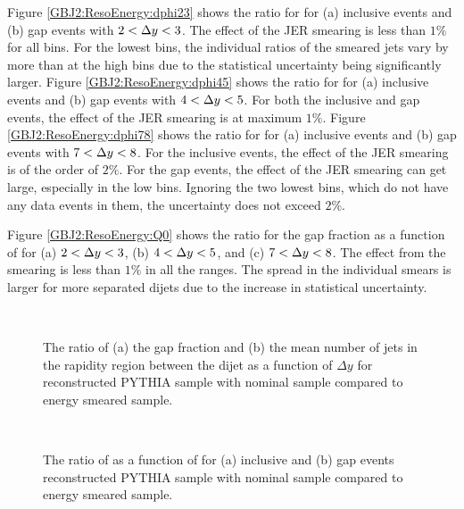 Figure \ref{GBJ2:ResoEnergy:dphi23} shows the ratio for \dphiDist{} for (a) inclusive events and (b) gap events with  $2<\mbox{$\Delta y$}{}<3$.
The effect of the JER smearing is less than  $1\%$ for all bins.
For the lowest \dphi{} bins, the individual ratios of the smeared jets vary by more than at the high \dphi{} bins due to the statistical uncertainty being significantly larger.
Figure \ref{GBJ2:ResoEnergy:dphi45} shows the ratio for \dphiDist{} for (a) inclusive events and (b) gap events with $4<\mbox{$\Delta y$}{}<5$.
For both the inclusive and gap events, the effect of the JER smearing is at maximum  $1\%$.
Figure \ref{GBJ2:ResoEnergy:dphi78} shows the ratio for \dphiDist{} for (a) inclusive events and (b) gap events with $7<\mbox{$\Delta y$}{}<8$.
For the inclusive events, the effect of the JER smearing is of the order of $2\%$.
For the gap events, the effect of the JER smearing can get large, especially in the low \dphi{} bins. 
Ignoring the two lowest \dphi{} bins, which do not have any data events in them, the uncertainty does not exceed $2\%$.

Figure \ref{GBJ2:ResoEnergy:Q0} shows the ratio for the gap fraction as a function of \qz{} for (a) $2<\mbox{$\Delta y$}{}<3$, (b) $4<\mbox{$\Delta y$}{}<5$, and (c) $7<\mbox{$\Delta y$}{}<8$.
The effect from the smearing is less than $1\%$ in all the ranges.
The spread in the individual smears is larger for more separated dijets due to the increase in statistical uncertainty. 


\begin{figure}
\centering
\mbox{
              \quad
              \quad
                              }
\caption[]{
The ratio of (a) the gap fraction and (b) the mean number of jets in the rapidity region between the dijet as a function of $\Delta y$ for reconstructed PYTHIA sample with nominal sample compared to energy smeared sample.
\label{GBJ2:ResoEnergy:Inclusive_gap}}
\end{figure}

\begin{figure}
\centering
\mbox{
              \quad
              \quad
                              }
\caption[]{
The ratio of \mean{\cosdphi{}} as a function of \dy{} for (a) inclusive and (b) gap events reconstructed PYTHIA sample with nominal sample compared to energy smeared sample.
\label{GBJ2:ResoEnergy:cos}}
\end{figure}

